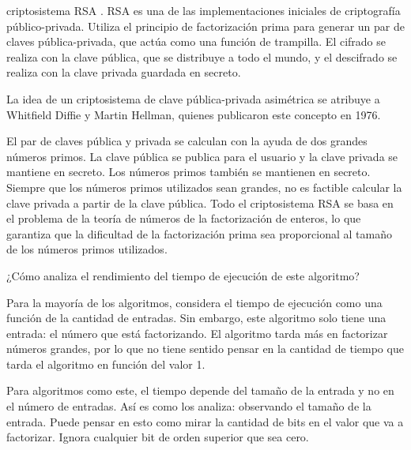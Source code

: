 \documentclass{article}
\begin{document}
criptosistema RSA \cite{raj2019foundations}.
RSA es una de las implementaciones iniciales de criptografía público-privada.
Utiliza el principio de factorización prima para generar un par de claves
pública-privada, que actúa como una función de trampilla. El cifrado se realiza
con la clave pública, que se distribuye a todo el mundo, y el descifrado se
realiza con la clave privada guardada en secreto.

La idea de un criptosistema de clave pública-privada asimétrica se atribuye a
Whitfield Diffie y Martin Hellman, quienes publicaron este concepto en 1976.


El par de claves pública y privada se calculan con la ayuda de dos grandes
números primos. La clave pública se publica para el usuario y la clave privada
se mantiene en secreto. Los números primos también se mantienen en secreto.
Siempre que los números primos utilizados sean grandes, no es factible calcular
la clave privada a partir de la clave pública. Todo el criptosistema RSA se basa
en el problema de la teoría de números de la factorización de enteros, lo que
garantiza que la dificultad de la factorización prima sea proporcional al tamaño
de los números primos utilizados.


¿Cómo analiza el rendimiento del tiempo de ejecución de este algoritmo? 

Para la mayoría de los algoritmos, considera el tiempo de ejecución como una
función de la cantidad de entradas. Sin embargo, este algoritmo solo tiene una
entrada: el número que está factorizando. El algoritmo tarda más en factorizar
números grandes, por lo que no tiene sentido pensar en la cantidad de tiempo que
tarda el algoritmo en función del valor 1. 

Para algoritmos como este, el tiempo
depende del tamaño de la entrada y no en el número de entradas. Así es como los
analiza: observando el tamaño de la entrada. Puede pensar en esto como mirar la
cantidad de bits en el valor que va a factorizar. Ignora cualquier bit de orden
superior que sea cero. 
\end{document}
